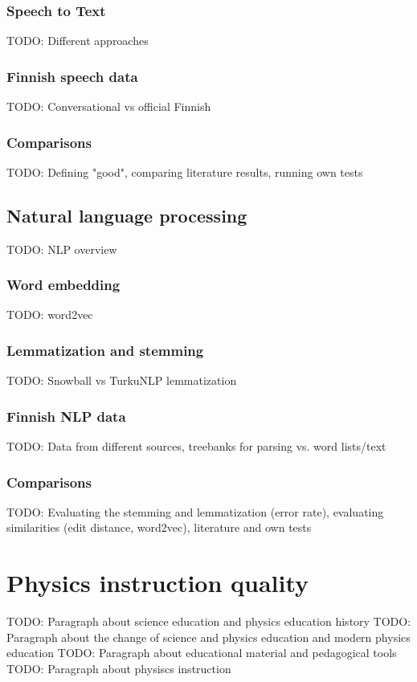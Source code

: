 \documentclass[utf8,english]{gradu3}
\begin{document}
\subsection{Speech to Text}
TODO: Different approaches

\subsection{Finnish speech data}
TODO: Conversational vs official Finnish

\subsection{Comparisons}
TODO: Defining "good", comparing literature results, running own tests

\section{Natural language processing}
TODO: NLP overview \parencite{silfverberg2016finnpos, kanerva2018turku}

\subsection{Word embedding}
TODO: word2vec

\subsection{Lemmatization and stemming}
TODO: Snowball vs TurkuNLP lemmatization

\subsection{Finnish NLP data}
TODO: Data from different sources, treebanks for parsing vs. word lists/text

\subsection{Comparisons}
TODO: Evaluating the stemming and lemmatization (error rate), evaluating similarities (edit distance, word2vec), literature and own tests

\chapter{Physics instruction quality}
TODO: Paragraph about science education and physics education history
TODO: Paragraph about the change of science and physics education and modern physics education
TODO: Paragraph about educational material and pedagogical tools
TODO: Paragraph about physiscs instruction
\end{document}
